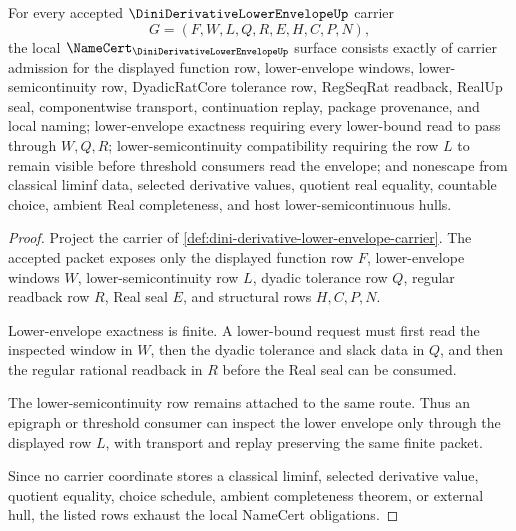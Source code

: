 \begin{theorem}
\label{thm:dini-derivative-lower-envelope-namecert-obligations}
For every accepted $\DiniDerivativeLowerEnvelopeUp$ carrier
$$
G=(F,W,L,Q,R,E,H,C,P,N),
$$
the local $\NameCert_{\DiniDerivativeLowerEnvelopeUp}$ surface consists exactly of carrier admission for the displayed function row, lower-envelope windows, lower-semicontinuity row, DyadicRatCore tolerance row, RegSeqRat readback, RealUp seal, componentwise transport, continuation replay, package provenance, and local naming; lower-envelope exactness requiring every lower-bound read to pass through $W,Q,R$; lower-semicontinuity compatibility requiring the row $L$ to remain visible before threshold consumers read the envelope; and nonescape from classical liminf data, selected derivative values, quotient real equality, countable choice, ambient Real completeness, and host lower-semicontinuous hulls.
\end{theorem}
\begin{proof}
Project the carrier of \autoref{def:dini-derivative-lower-envelope-carrier}. The accepted packet exposes only the displayed function row $F$, lower-envelope windows $W$, lower-semicontinuity row $L$, dyadic tolerance row $Q$, regular readback row $R$, Real seal $E$, and structural rows $H,C,P,N$.

Lower-envelope exactness is finite. A lower-bound request must first read the inspected window in $W$, then the dyadic tolerance and slack data in $Q$, and then the regular rational readback in $R$ before the Real seal can be consumed.

The lower-semicontinuity row remains attached to the same route. Thus an epigraph or threshold consumer can inspect the lower envelope only through the displayed row $L$, with transport and replay preserving the same finite packet.

Since no carrier coordinate stores a classical liminf, selected derivative value, quotient equality, choice schedule, ambient completeness theorem, or external hull, the listed rows exhaust the local NameCert obligations.
\end{proof}

